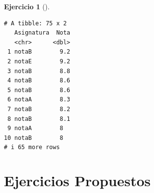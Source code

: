 \documentclass[
  a4paper,
]{scrreport}
\theoremstyle{definition}
\newtheorem{exercise}{Ejercicio}[chapter]
\theoremstyle{remark}
\begin{document}
\begin{exercise}[]
\begin{enumerate}
\begin{tcolorbox}
\begin{verbatim}
# A tibble: 75 x 2
   Asignatura  Nota
   <chr>      <dbl>
 1 notaB        9.2
 2 notaE        9.2
 3 notaB        8.8
 4 notaB        8.6
 5 notaB        8.6
 6 notaA        8.3
 7 notaB        8.2
 8 notaB        8.1
 9 notaA        8  
10 notaB        8  
# i 65 more rows
\end{verbatim}

  \end{tcolorbox}
\end{enumerate}

\end{exercise}

\hypertarget{ejercicios-propuestos}{%
\section{Ejercicios Propuestos}\label{ejercicios-propuestos}}
\end{document}
